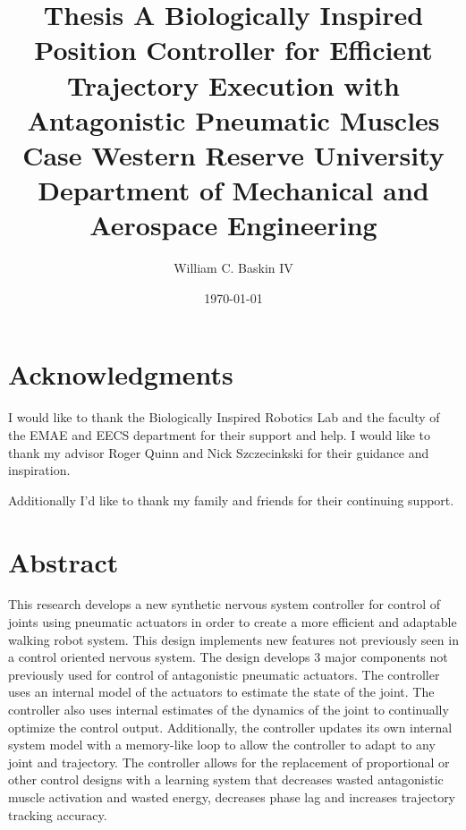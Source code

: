 \documentclass[12pt, letterpaper, oneside, onecolumn]{report} %
\author{William C. Baskin IV}
\title{Thesis}
\title{
  {A Biologically Inspired Position Controller for Efficient Trajectory Execution with Antagonistic Pneumatic Muscles}\\
  {\large Case Western Reserve University \\
  Department of Mechanical and Aerospace Engineering}%
}
\date{\today}
\begin{document}
\maketitle


\tableofcontents

\listoffigures

\chapter*{Acknowledgments}
\label{chap:acknowledgements}

I would like to thank the Biologically Inspired Robotics Lab and the faculty of
the EMAE and EECS department for their support and help. I would like to thank my advisor Roger Quinn and Nick Szczecinkski for their guidance and inspiration.

Additionally I'd like to thank my family and friends for their continuing support.

\chapter*{Abstract}
\label{chap:abstract}

This research develops a new synthetic nervous system controller for control of joints using pneumatic actuators in order to create a more efficient and adaptable walking robot system. This design implements new features not previously seen in a control oriented nervous system. The design develops 3 major components not previously used for control of antagonistic pneumatic actuators. The controller uses an internal model of the actuators to estimate the state of the joint. The controller also uses internal estimates of the dynamics of the joint to continually optimize the control output. Additionally, the controller updates its own internal system model with a memory-like loop to allow the controller to adapt to any joint and trajectory. The controller allows for the replacement of proportional or other control designs with a learning system that decreases wasted antagonistic muscle activation and wasted energy, decreases phase lag and increases trajectory tracking accuracy.

\end{document}
